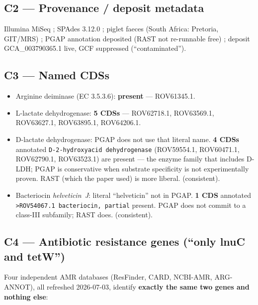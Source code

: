 \documentclass[11pt,letterpaper]{article}
\begin{document}
\subsection*{C2 --- Provenance / deposit metadata}
Illumina MiSeq \checkmark; SPAdes 3.12.0 \checkmark; piglet faeces (South Africa: Pretoria, GIT/MRS) \checkmark; PGAP annotation deposited (RAST not re-runnable free) \checkmark; deposit GCA\_003790365.1 live, GCF suppressed (``contaminated'').

\subsection*{C3 --- Named CDSs}
\begin{itemize}[leftmargin=1.2em]
  \item Arginine deiminase (EC 3.5.3.6): \textbf{present} --- ROV61345.1. \checkmark
  \item L-lactate dehydrogenase: \textbf{5 CDSs} --- ROV62718.1, ROV63569.1, ROV63627.1, ROV63895.1, ROV64206.1. \checkmark
  \item D-lactate dehydrogenase: PGAP does not use that literal name. \textbf{4 CDSs} annotated \texttt{D-2-hydroxyacid dehydrogenase} (ROV59554.1, ROV60471.1, ROV62790.1, ROV63523.1) are present --- the enzyme family that includes D-LDH; PGAP is conservative when substrate specificity is not experimentally proven. RAST (which the paper used) is more liberal. \checkmark (consistent).
  \item Bacteriocin \emph{helveticin~J}: literal ``helveticin'' not in PGAP. \textbf{1 CDS} annotated \texttt{>ROV54067.1 bacteriocin, partial} present. PGAP does not commit to a class-III subfamily; RAST does. \checkmark (consistent).
\end{itemize}

\subsection*{C4 --- Antibiotic resistance genes (``only lnuC and tetW'')}
Four independent AMR databases (ResFinder, CARD, NCBI-AMR, ARG-ANNOT), all refreshed 2026-07-03, identify \textbf{exactly the same two genes and nothing else}:
\end{document}
